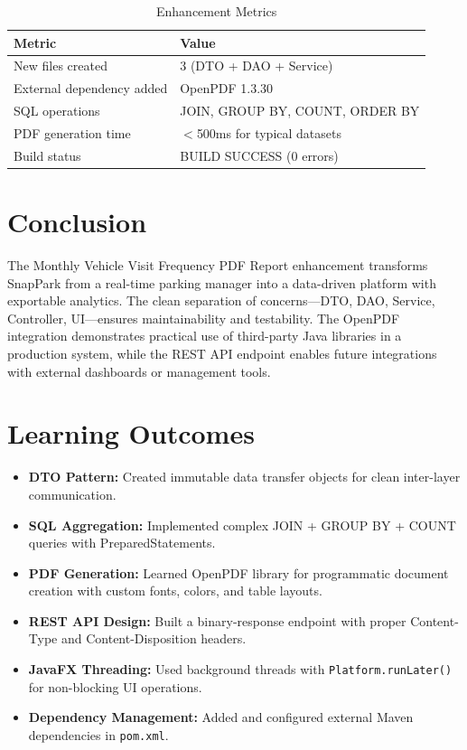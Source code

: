 \documentclass[12pt,a4paper]{article}
\begin{document}
\begin{table}[H]
\centering
\caption{Enhancement Metrics}
\begin{tabular}{|l|l|}
\hline
\textbf{Metric} & \textbf{Value} \\
\hline
New files created & 3 (DTO + DAO + Service) \\
\hline
External dependency added & OpenPDF 1.3.30 \\
\hline
SQL operations & JOIN, GROUP BY, COUNT, ORDER BY \\
\hline
PDF generation time & $<$500ms for typical datasets \\
\hline
Build status & BUILD SUCCESS (0 errors) \\
\hline
\end{tabular}
\end{table}

\section{Conclusion}

The Monthly Vehicle Visit Frequency PDF Report enhancement transforms SnapPark from a real-time parking manager into a data-driven platform with exportable analytics. The clean separation of concerns---DTO, DAO, Service, Controller, UI---ensures maintainability and testability. The OpenPDF integration demonstrates practical use of third-party Java libraries in a production system, while the REST API endpoint enables future integrations with external dashboards or management tools.

\section{Learning Outcomes}

\begin{itemize}
    \item \textbf{DTO Pattern:} Created immutable data transfer objects for clean inter-layer communication.
    \item \textbf{SQL Aggregation:} Implemented complex JOIN + GROUP BY + COUNT queries with PreparedStatements.
    \item \textbf{PDF Generation:} Learned OpenPDF library for programmatic document creation with custom fonts, colors, and table layouts.
    \item \textbf{REST API Design:} Built a binary-response endpoint with proper Content-Type and Content-Disposition headers.
    \item \textbf{JavaFX Threading:} Used background threads with \texttt{Platform.runLater()} for non-blocking UI operations.
    \item \textbf{Dependency Management:} Added and configured external Maven dependencies in \texttt{pom.xml}.
\end{itemize}
\end{document}
